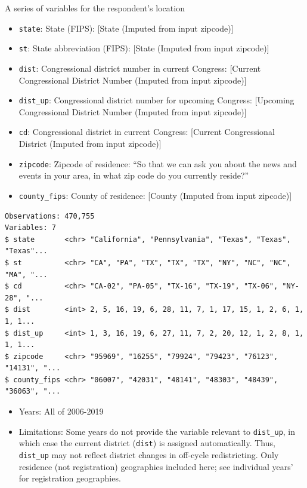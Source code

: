 \documentclass[10pt,article,oneside]{memoir}
\theoremstyle{definition}
\begin{document}
A series of variables for the respondent's location

\begin{itemize}
\tightlist
\item
  \texttt{state}: State (FIPS): {[}State (Imputed from input zipcode){]}
\item
  \texttt{st}: State abbreviation (FIPS): {[}State (Imputed from input
  zipcode){]}
\item
  \texttt{dist}: Congressional district number in current Congress:
  {[}Current Congressional District Number (Imputed from input
  zipcode){]}
\item
  \texttt{dist\_up}: Congressional district number for upcoming
  Congress: {[}Upcoming Congressional District Number (Imputed from
  input zipcode){]}
\item
  \texttt{cd}: Congressional district in current Congress: {[}Current
  Congressional District (Imputed from input zipcode){]}
\item
  \texttt{zipcode}: Zipcode of residence: ``So that we can ask you about
  the news and events in your area, in what zip code do you currently
  reside?''
\item
  \texttt{county\_fips}: County of residence: {[}County (Imputed from
  input zipcode){]}
\end{itemize}

\begin{verbatim}
Observations: 470,755
Variables: 7
$ state       <chr> "California", "Pennsylvania", "Texas", "Texas", "Texas"...
$ st          <chr> "CA", "PA", "TX", "TX", "TX", "NY", "NC", "NC", "MA", "...
$ cd          <chr> "CA-02", "PA-05", "TX-16", "TX-19", "TX-06", "NY-28", "...
$ dist        <int> 2, 5, 16, 19, 6, 28, 11, 7, 1, 17, 15, 1, 2, 6, 1, 1, 1...
$ dist_up     <int> 1, 3, 16, 19, 6, 27, 11, 7, 2, 20, 12, 1, 2, 8, 1, 1, 1...
$ zipcode     <chr> "95969", "16255", "79924", "79423", "76123", "14131", "...
$ county_fips <chr> "06007", "42031", "48141", "48303", "48439", "36063", "...
\end{verbatim}

\begin{itemize}
\tightlist
\item
  Years: All of 2006-2019
\item
  Limitations: Some years do not provide the variable relevant to
  \texttt{dist\_up}, in which case the current district (\texttt{dist})
  is assigned automatically. Thus, \texttt{dist\_up} may not reflect
  district changes in off-cycle redistricting. Only residence (not
  registration) geographies included here; see individual years' for
  registration geographies.
\end{itemize}
\end{document}
